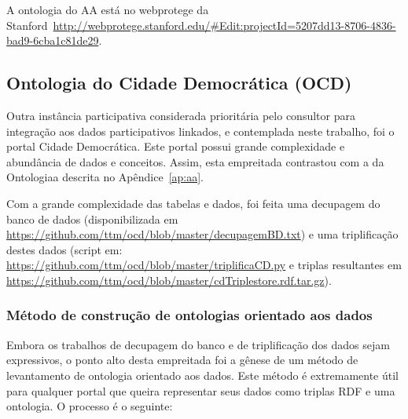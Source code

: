 \documentclass[12pt]{article}
\begin{document}
A ontologia do AA está no webprotege da Stanford~\url{http://webprotege.stanford.edu/#Edit:projectId=5207dd13-8706-4836-bad9-6cba1c81de29}.

\subsection{Ontologia do Cidade Democrática (OCD)}
Outra instância participativa considerada prioritária pelo consultor para integração aos dados participativos linkados, e contemplada neste trabalho, foi o portal Cidade Democrática. Este portal possui grande complexidade e abundância de dados e conceitos. Assim, esta empreitada contrastou com a da Ontologiaa descrita no Apêndice~\ref{ap:aa}.

Com a grande complexidade das tabelas e dados, foi feita uma decupagem do banco de dados (disponibilizada em \url{https://github.com/ttm/ocd/blob/master/decupagemBD.txt}) e uma triplificação destes dados (script em: \url{https://github.com/ttm/ocd/blob/master/triplificaCD.py} e triplas resultantes em \url{https://github.com/ttm/ocd/blob/master/cdTriplestore.rdf.tar.gz}).
\subsubsection{Método de construção de ontologias orientado aos dados}
Embora os trabalhos de decupagem do banco e de triplificação dos dados sejam expressivos, o ponto alto desta empreitada foi a gênese de um método de levantamento de ontologia orientado aos dados. Este método é extremamente útil para qualquer portal que queira representar seus dados como triplas RDF e uma ontologia. O processo é o seguinte:
\end{document}
